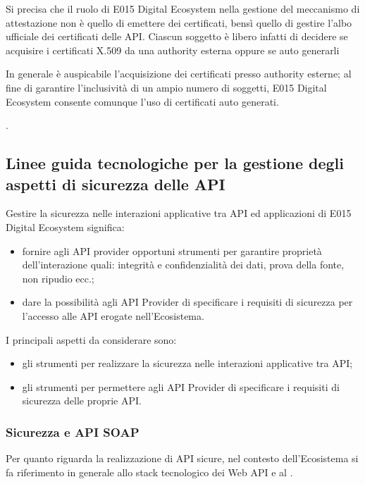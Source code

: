 \documentclass[letterpaper,10pt,italian]{sphinxmanual}
\begin{document}
Si precisa che il ruolo di E015 Digital Ecosystem nella gestione del meccanismo di attestazione non è quello di emettere dei certificati, bensì quello di gestire l’albo ufficiale dei certificati delle API. Ciascun soggetto è libero infatti di decidere se acquisire i certificati X.509 da una authority esterna oppure se auto generarli %
\begin{footnote}[2]\sphinxAtStartFootnote
In generale è auspicabile l’acquisizione dei certificati presso authority esterne; al fine di garantire l’inclusività di un ampio numero di soggetti, E015 \textendash{} Digital Ecosystem consente comunque l’uso di certificati auto generati.
%
\end{footnote}.


\subsection{Linee guida tecnologiche per la gestione degli aspetti di sicurezza delle API}
\label{\detokenize{sez22:linee-guida-tecnologiche-per-la-gestione-degli-aspetti-di-sicurezza-delle-api}}\label{\detokenize{sez22:sezione224}}
Gestire la sicurezza nelle interazioni applicative tra API ed applicazioni di E015 Digital Ecosystem significa:
\begin{itemize}
\item {} 
fornire agli API provider opportuni strumenti per garantire proprietà dell’interazione quali: integrità e confidenzialità dei dati, prova della fonte, non ripudio ecc.;

\item {} 
dare la possibilità agli API Provider di specificare i requisiti di sicurezza per l’accesso alle API erogate nell’Ecosistema.

\end{itemize}

I principali aspetti da considerare sono:
\begin{itemize}
\item {} 
gli strumenti per realizzare la sicurezza nelle interazioni applicative tra API;

\item {} 
gli strumenti per permettere agli API Provider di specificare i requisiti di sicurezza delle proprie API.

\end{itemize}


\subsubsection{Sicurezza e API SOAP}
\label{\detokenize{sez22:sicurezza-e-api-soap}}\label{\detokenize{sez22:sezione2241}}
Per quanto riguarda la realizzazione di API sicure, nel contesto dell’Ecosistema si fa riferimento in generale allo stack tecnologico dei Web API e al .
\end{document}
